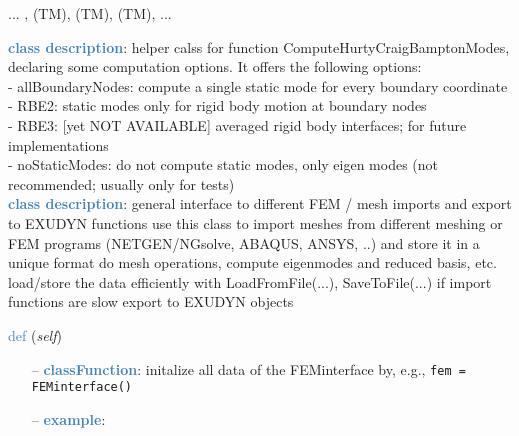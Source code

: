 \begin{itemize}[leftmargin=1.4cm]
\begin{itemize}[leftmargin=0.5cm]
\begin{itemize}[leftmargin=1.4cm]
\begin{itemize}[leftmargin=1.4cm]
\begin{itemize}[leftmargin=0.5cm]
 ...
, 
 (TM), 
 (TM), 
 (TM), 
 ...
\ei

%
\noindent\textcolor{steelblue}{{\bf class description}}:  helper calss for function ComputeHurtyCraigBamptonModes, declaring some computation options. It offers the following options:\\
 - allBoundaryNodes:     compute a single static mode for every boundary coordinate\\
 - RBE2:                 static modes only for rigid body motion at boundary nodes\\
 - RBE3:                 [yet NOT AVAILABLE] averaged rigid body interfaces; for future implementations\\
 - noStaticModes:        do not compute static modes, only eigen modes (not recommended; usually only for tests)
\vspace{3pt} \\ 
\noindent\textcolor{steelblue}{{\bf class description}}:  general interface to different FEM / mesh imports and export to EXUDYN functions
         use this class to import meshes from different meshing or FEM programs (NETGEN/NGsolve, ABAQUS, ANSYS, ..) and store it in a unique format
         do mesh operations, compute eigenmodes and reduced basis, etc.
         load/store the data efficiently with LoadFromFile(...), SaveToFile(...)  if import functions are slow
         export to EXUDYN objects
\vspace{3pt} \\ 
\begin{flushleft}
\noindent \textcolor{steelblue}{def {\bf {}}}\label{sec:FEM:FEMinterface:__init__}
({\it self})
\end{flushleft}
\setlength{\itemindent}{0.7cm}
\begin{itemize}[leftmargin=0.7cm]
  \item[--]  \textcolor{steelblue}{\bf classFunction}: initalize all data of the FEMinterface by, e.g., \texttt{fem = FEMinterface()}  \item[--]  \textcolor{steelblue}{\bf example}: \vspace{-12pt}\ei\begin{lstlisting}[language=Python, xleftmargin=36pt]

\end{lstlisting}
\end{itemize}
\end{itemize}
\end{itemize}
\end{itemize}
\end{itemize}
\end{itemize}
